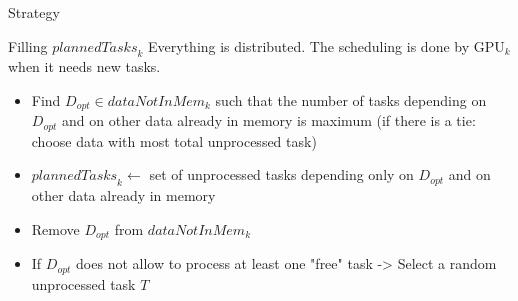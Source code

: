 \documentclass{libs/ufc_format}
\newcommand{\GPU}[1]{\ensuremath{\mathrm{GPU}_{#1}}\xspace}
\newcommand{\Dtouse}[1]{\ensuremath{\mathit{dataNotInMem}_{#1}}\xspace}
\newcommand{\plannedTasks}[1]{\ensuremath{\mathit{plannedTasks}_{#1}}\xspace}
\newcommand{\Dopt}{\ensuremath{D_{\mathit{opt}}}\xspace}
\newcommand{\Treturned}{\ensuremath{T}\xspace}
\begin{document}
\begin{frame}{Strategy}
	\begin{alertblock}{Filling $\plannedTasks{k}$}
		Everything is distributed. The scheduling is done by \GPU{k} when it needs new tasks.
		\begin{itemize}
			\item Find $D_{opt}\in\Dtouse{k}$ such that the number of tasks depending on \Dopt and on other data already in memory is maximum
			(if there is a tie: choose data with most total unprocessed task)
			\item $\plannedTasks{k} \gets $ set of unprocessed tasks depending only on $\Dopt$ and on other data already in memory 
			\item Remove $\Dopt$ from \Dtouse{k}
			\item If \Dopt does not allow to process at least one "free" task  -> Select a random unprocessed task \Treturned
		\end{itemize}
	\end{alertblock}
\end{frame}
\end{document}

